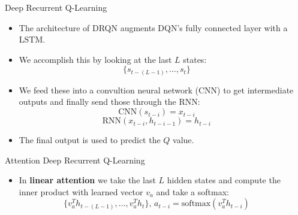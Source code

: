 \documentclass[final]{beamer}
\newlength{\onecolwid}
\newlength{\twocolwid}
\begin{document}
\begin{frame}[t]
\begin{columns}[t]
\begin{column}{\twocolwid}
\begin{columns}[t,totalwidth=\twocolwid]
\begin{column}{\onecolwid}

\begin{block}{Deep Recurrent Q-Learning}
\begin{itemize}
    \item The architecture of DRQN augments DQN's fully connected layer with a LSTM.
    \item We accomplish this by looking at the last $L$ states:
        $$ \{s_{t-(L-1)}, \dots, s_{t}\} $$
    \item We feed these into a convultion neural network (CNN) to get intermediate
        outputs and finally send those through the RNN:
        $$\text{CNN}(s_{t-i}) = x_{t-i}$$
        $$\text{RNN}(x_{t-i}, h_{t-i-1}) = h_{t-i}$$
    \item The final output is used to predict the $Q$ value.
\end{itemize}

\end{block}

\begin{block}{Attention Deep Recurrent Q-Learning}
    \begin{itemize}
        \item In \textbf{linear attention} we take the last $L$ hidden states and
            compute the inner product with learned vector $v_a$ and take a softmax:
            $$\{v_a^Th_{t-(L-1)}, \dots, v_a^Th_t\} \text{, }
              a_{t-i} = \text{softmax}(v_a^Th_{t-i})$$
    \end{itemize}
\end{block}


\end{column} %

\begin{column}{\onecolwid}\vspace{-.6in} %



\end{column}
\end{columns}
\end{column}
\end{columns}
\end{frame}
\end{document}
